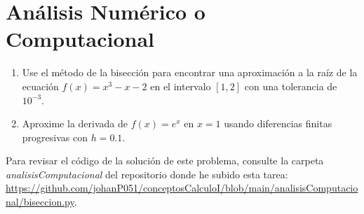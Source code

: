 \section{Análisis Numérico o Computacional}

\begin{enumerate}
    \item Use el método de la bisección para encontrar una aproximación a la raíz de la ecuación \(f(x)=x^3-x-2\) en el intervalo \([1,2]\) con una tolerancia de \(10^{-3}\).
    \item Aproxime la derivada de \(f(x)=e^x\) en \(x=1\) usando diferencias finitas progresivas con \(h=0.1\).
\end{enumerate}

Para revisar el código de la solución de este problema, consulte la carpeta \textit{analisisComputacional} del repositorio donde he subido esta tarea: \url{https://github.com/johanP051/conceptosCalculoI/blob/main/analisisComputacional/biseccion.py}.